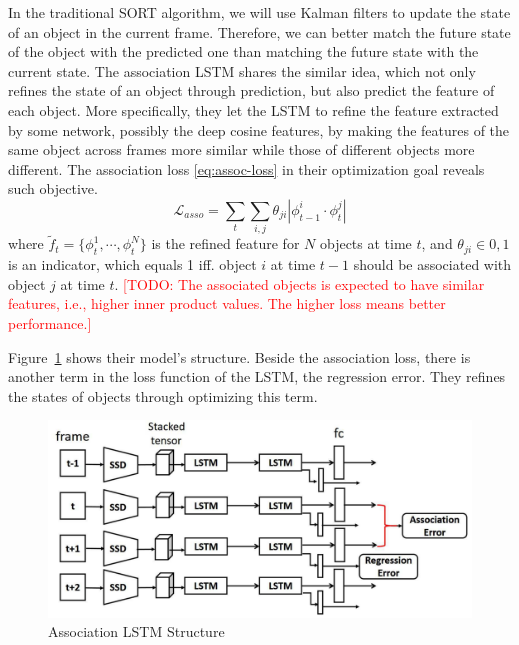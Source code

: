\documentclass[conference]{IEEEtran}
\newcommand{\todo}[1]{\textcolor{red}{[TODO: #1]}}
\begin{document}
In the traditional SORT algorithm, we will use Kalman filters to update the state of an object in the current frame.
Therefore, we can better match the future state of the object with the predicted one than matching the future state with the current state.
The association LSTM shares the similar idea, which not only refines the state of an object through prediction, but also predict the feature of each object.
More specifically, they let the LSTM to refine the feature extracted by some network, possibly the deep cosine features, by making the features of the same object across frames more similar while those of different objects more different.
The association loss \eqref{eq:assoc-loss} in their optimization goal reveals such objective.
\begin{equation}
    \mathcal{L}_{asso} = \sum_t \sum_{i,j} \theta_{ji}|\phi_{t-1}^i \cdot \phi_t^j|
    \label{eq:assoc-loss}
\end{equation}
where $\tilde{f}_t = \{\phi_t^1, \cdots, \phi_t^N\}$ is the refined feature for $N$ objects at time $t$, and $\theta_{ji} \in 0, 1$ is an indicator, which equals 1 iff. object $i$ at time $t-1$ should be associated with object $j$ at time $t$.
\todo{The associated objects is expected to have similar features, i.e., higher inner product values.
The higher loss means better performance.}

Figure~\ref{fig:lstm-struct} shows their model's structure.
Beside the association loss, there is another term in the loss function of the LSTM, the regression error.
They refines the states of objects through optimizing this term.

\begin{figure}[h]
    \centering
    \includegraphics[width=0.99\linewidth]{fig/assoc_lstm.png}
    \caption{Association LSTM Structure\protect\footnotemark}
    \label{fig:lstm-struct}
\end{figure}
\end{document}
